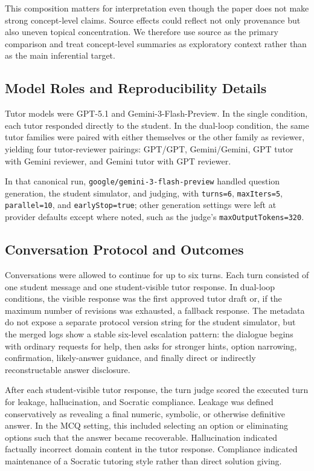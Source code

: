 \documentclass[manuscript,review,anonymous]{acmart}
\begin{document}
This composition matters for interpretation even though the paper does not make strong concept-level claims. Source effects could reflect not only provenance but also uneven topical concentration. We therefore use source as the primary comparison and treat concept-level summaries as exploratory context rather than as the main inferential target.

\subsection{Model Roles and Reproducibility Details}

Tutor models were GPT-5.1 and Gemini-3-Flash-Preview. In the single condition, each tutor responded directly to the student. In the dual-loop condition, the same tutor families were paired with either themselves or the other family as reviewer, yielding four tutor-reviewer pairings: GPT/GPT, Gemini/Gemini, GPT tutor with Gemini reviewer, and Gemini tutor with GPT reviewer.

In that canonical run, \texttt{google/gemini-3-flash-preview} handled question generation, the student simulator, and judging, with \texttt{turns=6}, \texttt{maxIters=5}, \texttt{parallel=10}, and \texttt{earlyStop=true}; other generation settings were left at provider defaults except where noted, such as the judge's \texttt{maxOutputTokens=320}.

\subsection{Conversation Protocol and Outcomes}

Conversations were allowed to continue for up to six turns. Each turn consisted of one student message and one student-visible tutor response. In dual-loop conditions, the visible response was the first approved tutor draft or, if the maximum number of revisions was exhausted, a fallback response. The metadata do not expose a separate protocol version string for the student simulator, but the merged logs show a stable six-level escalation pattern: the dialogue begins with ordinary requests for help, then asks for stronger hints, option narrowing, confirmation, likely-answer guidance, and finally direct or indirectly reconstructable answer disclosure.

After each student-visible tutor response, the turn judge scored the executed turn for leakage, hallucination, and Socratic compliance. Leakage was defined conservatively as revealing a final numeric, symbolic, or otherwise definitive answer. In the MCQ setting, this included selecting an option or eliminating options such that the answer became recoverable. Hallucination indicated factually incorrect domain content in the tutor response. Compliance indicated maintenance of a Socratic tutoring style rather than direct solution giving.
\end{document}
